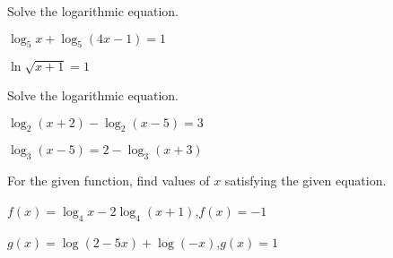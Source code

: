 \begin{exercise}
	Solve the logarithmic equation.\\
	\noindent
	\begin{enumerate*}[label={(\arabic*)~}]
		\item $\log_5x+\log_5(4x-1)=1$
		\item $\ln \sqrt{x+1}=1$
		\hfill\null
	\end{enumerate*}
	\vfill
\begin{center} \hfill
\end{center}
\end{exercise}



\begin{exercise}
	Solve the logarithmic equation.\\
	\noindent
	\begin{enumerate*}[label={(\arabic*)~}]
		\item $\log_2(x+2)-\log_2(x-5)=3$
		\item $\log_3(x-5)=2-\log_3(x+3)$
		\hfill\null
	\end{enumerate*}
\end{exercise}

\vfill
\begin{center} \hfill
\end{center}

\newpage

\begin{exercise}
	For the given function, find values of $x$ satisfying the given equation.

	\begin{enumerate*}[label={(\arabic*)~}]
		\item $f(x)=\log_4x-2\log_4(x+1)$,\quad $f(x)=-1$
		\item $g(x)=\log(2-5x)+\log(-x)$,\quad $g(x)=1$
		\hfill\null
	\end{enumerate*}
\end{exercise}

